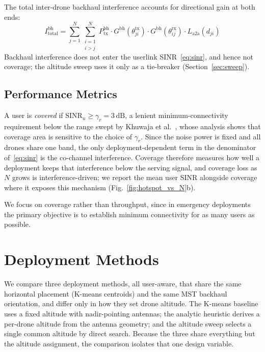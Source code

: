 \documentclass[conference]{IEEEtran}
\newcommand{\dB}{\,\mathrm{dB}}
\begin{document}
The total inter-drone backhaul interference accounts for directional gain at both ends:
\begin{equation}
\label{eq:bh_interf}
I_{\mathrm{total}}^{\mathrm{bh}} = \sum_{j=1}^{N}\sum_{\substack{i=1\\i>j}}^{N} P_{\mathrm{tx}}^{\mathrm{bh}} \cdot G^{\mathrm{bh}}(\theta_{ji}^{\mathrm{tx}}) \cdot G^{\mathrm{bh}}(\theta_{ij}^{\mathrm{rx}}) \cdot L_{\mathrm{a2a}}(d_{ji})
\end{equation}
Backhaul interference does not enter the userlink SINR~\eqref{eq:sinr}, and hence not coverage; the altitude sweep uses it only as a tie-breaker (Section~\ref{sec:sweep}).

\subsection{Performance Metrics}

A user is \emph{covered} if $\mathrm{SINR}_u \geq \gamma_r = 3\dB$, a lenient minimum-connectivity requirement below the range swept by Khuwaja et al.~\cite{khuwaja2019}, whose analysis shows that coverage area is sensitive to the choice of $\gamma_r$.
Since the noise power is fixed and all drones share one band, the only deployment-dependent term in the denominator of~\eqref{eq:sinr} is the co-channel interference. Coverage therefore measures how well a deployment keeps that interference below the serving signal, and coverage loss as $N$ grows is interference-driven; we report the mean user SINR alongside coverage where it exposes this mechanism (Fig.~\ref{fig:hotspot_vs_N}b).

We focus on coverage rather than throughput, since in emergency deployments the primary objective is to establish minimum connectivity for as many users as possible.
\section{Deployment Methods}
\label{sec:methods}

We compare three deployment methods, all user-aware, that share the same horizontal placement (K-means centroids) and the same MST backhaul orientation, and differ only in how they set drone altitude.
The K-means baseline uses a fixed altitude with nadir-pointing antennas; the analytic heuristic derives a per-drone altitude from the antenna geometry; and the altitude sweep selects a single common altitude by direct search.
Because the three share everything but the altitude assignment, the comparison isolates that one design variable.
\end{document}
